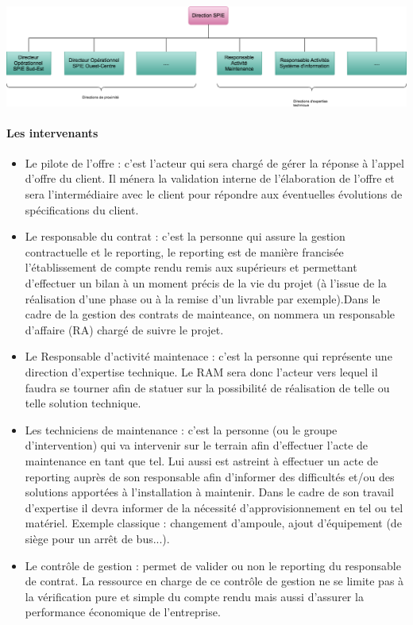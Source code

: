\begin {center}
\includegraphics[width=\textwidth]{png/DiagrammeOrganisationnelSPIE.png}
\end {center}



\paragraph{Les intervenants}

\begin{itemize}
\item Le pilote de l'offre : c'est l'acteur qui sera chargé de gérer la réponse à l'appel d'offre du client. Il ménera la validation interne de l'élaboration de l'offre et sera l'intermédiaire avec le client pour répondre aux éventuelles évolutions de spécifications du client.
\item Le responsable du contrat : c’est la personne qui assure la gestion contractuelle et le reporting, le reporting est de manière francisée l’établissement de compte rendu remis aux supérieurs et permettant d’effectuer un bilan à un moment précis de la vie du projet (à l’issue de la réalisation d’une phase ou à la remise d’un livrable par exemple).Dans le cadre de la gestion des contrats de mainteance, on nommera un responsable d'affaire (RA) chargé de suivre le projet.
\item Le Responsable d'activité maintenace : c'est la personne qui représente une direction d'expertise technique. Le RAM sera donc l'acteur vers lequel il faudra se tourner afin de statuer sur la possibilité de réalisation de telle ou telle solution technique.
\item Les techniciens de maintenance : c’est la personne (ou le groupe d’intervention) qui va intervenir sur le terrain afin d'effectuer l’acte de maintenance en tant que tel. Lui aussi est astreint à effectuer un acte de reporting auprès de son responsable afin d’informer des difficultés et/ou des solutions apportées à l’installation à maintenir. Dans le cadre de son travail d’expertise il devra informer de la nécessité d’approvisionnement en tel ou tel matériel. Exemple classique : changement d’ampoule, ajout d'équipement (de siège pour un arrêt de bus...).
\item Le contrôle de gestion : permet de valider ou non le reporting du responsable de contrat. La ressource en charge de ce contrôle de gestion ne se limite pas à la vérification pure et simple du compte rendu mais aussi d’assurer la performance économique de l’entreprise.
\end{itemize}

